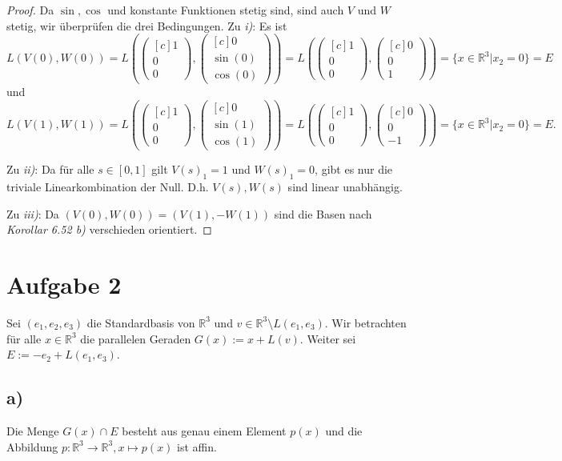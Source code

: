 \documentclass{article}
\newcommand{\RR}{\mathbb{R}}
\newcommand{\vect}[1]{\begin{pmatrix*}[c] #1 \end{pmatrix*}}
\begin{document}
\begin{proof}
  Da $\sin,\cos$ und konstante Funktionen stetig sind,
  sind auch $V$ und $W$ stetig, wir überprüfen die drei Bedingungen.
  Zu  \textit{i)}:
  Es ist
  $$
    L(V(0),W(0)) = L\left(\vect{1 \\ 0 \\ 0} , \vect{0 \\ \sin(0) \\ \cos(0)}\right)
    = L\left(\vect{1 \\ 0 \\ 0} , \vect{0 \\ 0 \\ 1}\right)
    = \{ x \in \RR^3 | x_2 = 0 \} = E
  $$
  und
  $$
    L(V(1),W(1)) =  L\left(\vect{1 \\ 0 \\ 0} , \vect{0 \\ \sin(1) \\ \cos(1)}\right)
    = L\left(\vect{1 \\ 0 \\ 0} , \vect{0 \\ 0 \\ -1}\right)
    = \{ x \in \RR^3 | x_2 = 0 \} = E.
  $$

  Zu \textit{ii)}:
  Da für alle $s \in [0,1]$ gilt $V(s)_1 = 1$ und
  $W(s)_1 = 0$, gibt es nur die triviale Linearkombination der Null.
  D.h. $V(s),W(s)$ sind linear unabhängig.

  Zu \textit{iii)}:
  Da $(V(0), W(0)) = (V (1), -W(1))$ sind die Basen nach \textit{Korollar 6.52 b)}
  verschieden orientiert.
\end{proof}


\newpage


\section*{Aufgabe 2}

Sei $(e_1, e_2, e_3)$ die Standardbasis von $\RR^3$ und $v \in \RR^3 \setminus L(e_1, e_3)$.
Wir betrachten für alle $x \in \RR^3$ die parallelen
Geraden $G(x) := x+L(v)$. Weiter sei $E := -e_2 + L(e_1, e_3)$.

\subsection*{a)}
Die Menge $G(x) \cap E$ besteht aus genau einem Element $p(x)$ und
die Abbildung $p : \RR^3 \to \RR^3, x \mapsto p(x)$ ist affin.
\end{document}
